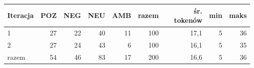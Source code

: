 \begin{tabular}{lrrrrrrrr}
\toprule
Iteracja & POZ & NEG & NEU & AMB & razem & śr. tokenów & min & maks \\
\midrule
1 & 27 & 22 & 40 & 11 & 100 & 17{,}1 & 5 & 36 \\
2 & 27 & 24 & 43 & 6 & 100 & 16{,}1 & 5 & 35 \\
\midrule
razem & 54 & 46 & 83 & 17 & 200 & 16{,}6 & 5 & 36 \\
\bottomrule
\end{tabular}
